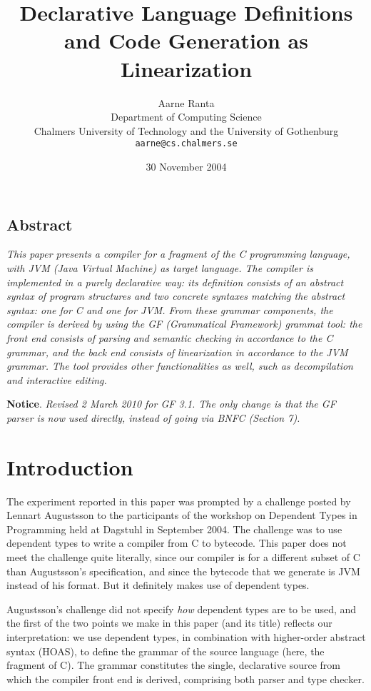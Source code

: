 \documentclass[12pt]{article}
\title{{\bf Declarative Language Definitions and Code Generation as Linearization}}
\author{Aarne Ranta \\
  Department of Computing Science \\
  Chalmers University of Technology and the University of Gothenburg\\
  {\tt aarne@cs.chalmers.se}}
\date{30 November 2004}
\begin{document}
\maketitle


\subsection*{Abstract}

{\em
This paper presents a compiler for a fragment of the C programming
language, with JVM (Java Virtual Machine) as target language.
The compiler is implemented in a purely declarative way:
its definition consists of an abstract syntax of program
structures and two concrete syntaxes matching the abstract
syntax: one for C and one for JVM. From these grammar components,
the compiler is derived by using the GF (Grammatical Framework)
grammat tool: the front end consists of parsing and semantic
checking in accordance to the C grammar, and the back end consists
of linearization in accordance to the JVM grammar. The tool provides
other functionalities as well, such as decompilation and interactive
editing. 
}

{\bf Notice}. {\em 
Revised 2 March 2010 for GF 3.1. The only change is that the GF
parser is now used directly, instead of going via BNFC (Section 7).
}

\section{Introduction}

The experiment reported in this paper was prompted by a challenge
posted by Lennart Augustsson to the participants of the workshop
on Dependent Types in Programming held at Dagstuhl in September 2004.
The challenge was to use dependent types to write a compiler from
C to bytecode. This paper does not meet the challenge quite literally,
since our compiler is for a different subset of C than Augustsson's
specification, and since the bytecode that we generate is JVM instead
of his format. But it definitely makes use of dependent types.

Augustsson's  challenge did not specify \textit{how} dependent
types are to be used, and the first of the two points we make in this
paper (and its title) reflects our interpretation:
we use dependent types, in combination with higher-order abstract syntax (HOAS),
to define the grammar of the source language (here, the fragment of C).
The grammar constitutes the single, declarative source from which
the compiler front end is derived, comprising both parser and type
checker.
\end{document}
